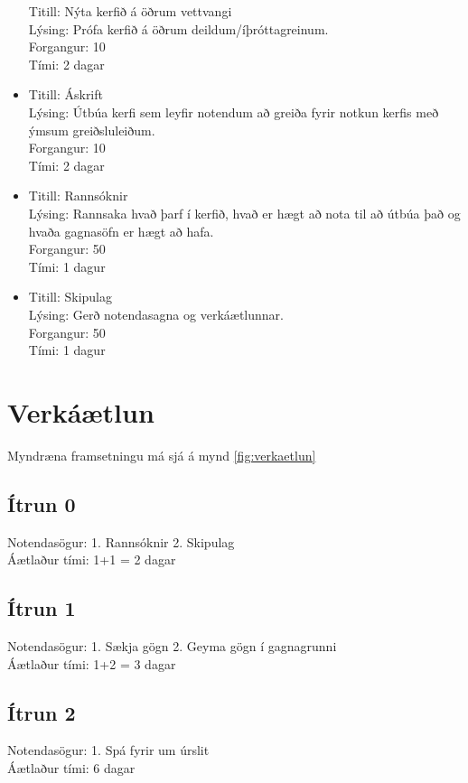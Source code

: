 \documentclass[a4paper,11pt]{article}
\begin{document}
\begin{itemize}
  Titill: Nýta kerfið á öðrum vettvangi\\
  Lýsing: Prófa kerfið á öðrum deildum/íþróttagreinum.\\
  Forgangur: 10 \\
  Tími: 2 dagar\\
\item
  Titill: Áskrift\\
  Lýsing: Útbúa kerfi sem leyfir notendum að greiða fyrir notkun kerfis með ýmsum greiðsluleiðum. \\
  Forgangur: 10 \\
  Tími: 2 dagar\\
\item
  Titill: Rannsóknir\\
  Lýsing: Rannsaka hvað þarf í kerfið, hvað er hægt að nota til að útbúa það og hvaða gagnasöfn er hægt að hafa.\\
  Forgangur: 50\\
  Tími: 1 dagur\\
\item
  Titill: Skipulag\\
  Lýsing: Gerð notendasagna og verkáætlunnar.\\
  Forgangur: 50\\
  Tími: 1 dagur\\
\end{itemize}
\section{Verkáætlun}
Myndræna framsetningu má sjá á mynd \ref{fig:verkaetlun}
\subsection{Ítrun 0}
Notendasögur: 1. Rannsóknir 2. Skipulag\\
Áætlaður tími: 1+1 = 2 dagar
\subsection{Ítrun 1}
Notendasögur: 1. Sækja gögn 2. Geyma gögn í gagnagrunni\\
Áætlaður tími: 1+2 = 3 dagar

\subsection{Ítrun 2}
Notendasögur: 1. Spá fyrir um úrslit\\
Áætlaður tími: 6 dagar
\end{document}
